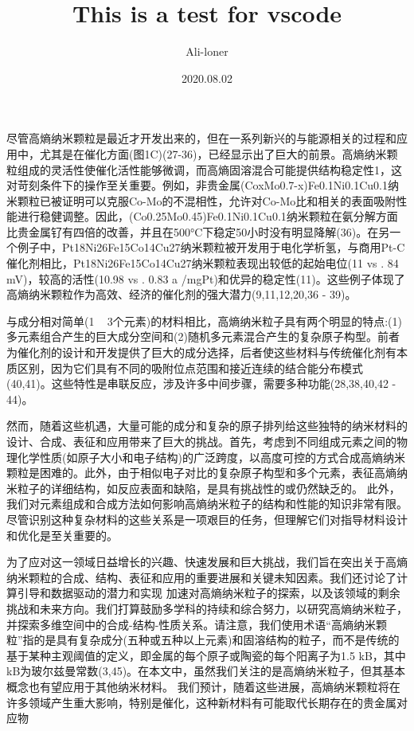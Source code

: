 \documentclass[a4paper]{article}
\title{\heiti\zihao{2} This is a test for vscode}
\author{\songti Ali-loner}
\date{2020.08.02}
\begin{document}
    \maketitle
\begin{abstract}
    \lipsum[2]
\end{abstract}
\tableofcontents
尽管高熵纳米颗粒是最近才开发出来的，但在一系列新兴的与能源相关的过程和应用中，尤其是在催化方面(图1C)(27-36)，已经显示出了巨大的前景。高熵纳米颗粒组成的灵活性使催化活性能够微调，而高熵固溶混合可能提供结构稳定性1，这对苛刻条件下的操作至关重要。例如，非贵金属(CoxMo0.7-x)Fe0.1Ni0.1Cu0.1纳米颗粒已被证明可以克服Co-Mo的不混相性，允许对Co-Mo比和相关的表面吸附性能进行稳健调整。因此，(Co0.25Mo0.45)Fe0.1Ni0.1Cu0.1纳米颗粒在氨分解方面比贵金属钌有四倍的改善，并且在500°C下稳定50小时没有明显降解(36)。在另一个例子中，Pt18Ni26Fe15Co14Cu27纳米颗粒被开发用于电化学析氢，与商用Pt-C催化剂相比，Pt18Ni26Fe15Co14Cu27纳米颗粒表现出较低的起始电位(11 vs . 84 mV)，较高的活性(10.98 vs . 0.83 a /mgPt)和优异的稳定性(11)。这些例子体现了高熵纳米颗粒作为高效、经济的催化剂的强大潜力(9,11,12,20,36 - 39)。

与成分相对简单(1 ~ 3个元素)的材料相比，高熵纳米粒子具有两个明显的特点:(1)多元素组合产生的巨大成分空间和(2)随机多元素混合产生的复杂原子构型。前者为催化剂的设计和开发提供了巨大的成分选择，后者使这些材料与传统催化剂有本质区别，因为它们具有不同的吸附位点范围和接近连续的结合能分布模式(40,41)。这些特性是串联反应，涉及许多中间步骤，需要多种功能(28,38,40,42 - 44)。



然而，随着这些机遇，大量可能的成分和复杂的原子排列给这些独特的纳米材料的设计、合成、表征和应用带来了巨大的挑战。首先，考虑到不同组成元素之间的物理化学性质(如原子大小和电子结构)的广泛跨度，以高度可控的方式合成高熵纳米颗粒是困难的。此外，由于相似电子对比的复杂原子构型和多个元素，表征高熵纳米粒子的详细结构，如反应表面和缺陷，是具有挑战性的或仍然缺乏的。
此外，我们对元素组成和合成方法如何影响高熵纳米粒子的结构和性能的知识非常有限。尽管识别这种复杂材料的这些关系是一项艰巨的任务，但理解它们对指导材料设计和优化是至关重要的。


为了应对这一领域日益增长的兴趣、快速发展和巨大挑战，我们旨在突出关于高熵纳米颗粒的合成、结构、表征和应用的重要进展和关键未知因素。我们还讨论了计算引导和数据驱动的潜力和实现
加速对高熵纳米粒子的探索，以及该领域的剩余挑战和未来方向。我们打算鼓励多学科的持续和综合努力，以研究高熵纳米粒子，并探索多维空间中的合成-结构-性质关系。请注意，我们使用术语“高熵纳米颗粒”指的是具有复杂成分(五种或五种以上元素)和固溶结构的粒子，而不是传统的基于某种主观阈值的定义，即金属的每个原子或陶瓷的每个阳离子为1.5 kB，其中kB为玻尔兹曼常数(3,45)。在本文中，虽然我们关注的是高熵纳米粒子，但其基本概念也有望应用于其他纳米材料。
我们预计，随着这些进展，高熵纳米颗粒将在许多领域产生重大影响，特别是催化，这种新材料有可能取代长期存在的贵金属对应物
\end{document}

